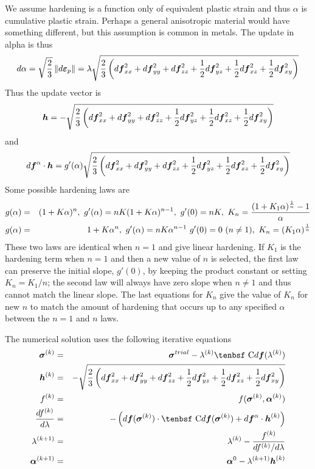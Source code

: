 \documentclass[11pt]{book}
\renewcommand{\vec}[1]{\boldsymbol{#1}}
\def\C{\hbox{\tenbsf C}}
\def\dpl{d \vec{\varepsilon}_{p}}
\def\df{d \vec{f}}
\def\dfa{d \vec{f}^\alpha}
\begin{document}
We assume hardening is a function only of equivalent plastic strain and thus $\alpha$ is cumulative plastic strain. Perhaps a general anisotropic material would have something different, but this assumption is common in metals. The update in alpha is thus
\begin{equation}
     d\alpha = \sqrt{2\over 3}\thinspace \| \dpl\| = \lambda \sqrt{{2\over 3}\left(\df_{xx}^2 + \df_{yy}^2 + \df_{zz}^2 + {1\over2}\df_{yz}^2+ {1\over2}\df_{xz}^2+ {1\over2}\df_{xy}^2\right)}
\end{equation}
Thus the update vector is
\begin{equation}
      \vec h = - \sqrt{{2\over 3}\left(\df_{xx}^2 + \df_{yy}^2 + \df_{zz}^2 + {1\over2}\df_{yz}^2+ {1\over2}\df_{xz}^2+ {1\over2}\df_{xy}^2\right)}
\end{equation}
and
\begin{equation}
   \dfa \cdot \vec h =  g'(\alpha)\sqrt{{2\over 3}\left(\df_{xx}^2 + \df_{yy}^2 + \df_{zz}^2 + {1\over2}\df_{yz}^2+ {1\over2}\df_{xz}^2 + {1\over2}\df_{xy}^2\right)}
\end{equation}
Some possible hardening laws are
\begin{eqnarray}
     g(\alpha)  & = & (1 + K\alpha)^n, \  g'(\alpha) =  nK(1+K\alpha)^{n-1}, \  g'(0)=nK, \  K_n={(1+K_1\alpha)^{1\over n} - 1\over \alpha}  \\
     g(\alpha)  & = & 1 + K\alpha^n, \  g'(\alpha) =  nK\alpha^{n-1} \  g'(0)=0\ (n\ne1), \ K_n = (K_1\alpha)^{1\over n}
\end{eqnarray}
These two laws are identical when $n=1$ and give linear hardening. If $K_1$ is the hardening term when $n=1$ and then a new value of $n$ is selected, the first law can preserve the initial slope, $g'(0)$, by keeping the product constant or setting $K_n = K_1/n$; the second law will always have zero slope when $n\ne1$ and thus cannot match the linear slope. The last equations for $K_n$ give the value of $K_n$ for new $n$ to match the amount of hardening that occurs up to any specified $\alpha$ between the $n=1$ and $n$ laws.

The numerical solution uses the following iterative equations
\begin{eqnarray}
       \vec\sigma^{(k)} & = & \vec\sigma^{trial} - \lambda^{(k)}\C\df(\lambda^{(k)}) \\
        \vec h^{(k)} & = & -\sqrt{{2\over 3}\left(\df_{xx}^2 + \df_{yy}^2 + \df_{zz}^2 + {1\over2}\df_{yz}^2+ {1\over2}\df_{xz}^2+ {1\over2}\df_{xy}^2\right)}\\
        f^{(k)} & = &  f( \vec\sigma^{(k)},\vec\alpha^{(k)})  \\
        {df^{(k)}\over d\lambda} & = & -\left( \df(\vec\sigma^{(k)})\cdot \C\df(\vec\sigma^{(k)})  + \dfa \cdot \vec h^{(k)}\right) \\
        \lambda^{(k+1)} & = & \lambda^{(k)} - {f^{(k)} \over {df^{(k)}/ d\lambda} } \\
        \vec\alpha^{(k+1)} & = & \vec\alpha^{0} -  \lambda^{(k+1)} \vec h^{(k)}
\end{eqnarray}
\end{document}
